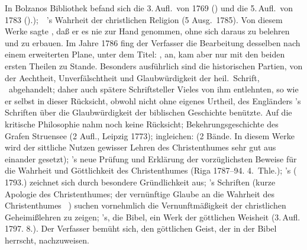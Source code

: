 \begin{aufza}
\begin{aufzb}
{	In Bolzanos Bibliothek befand sich die 3.\,Aufl.\ von 1769 () und die 5.\,Aufl.\ von 1783 ().});~\ 's Wahrheit der christlichen Religion (5 Ausg.\ 1785). Von diesem Werke sagte , daß er es nie zur Hand genommen, ohne sich daraus zu belehren und zu erbauen. Im Jahre 1786 fing der Verfasser die Bearbeitung desselben nach einem erweiterten Plane, unter dem Titel: , an, kam aber nur mit den beiden ersten Theilen zu Stande. Besonders ausführlich sind die historischen Partien, von der Aechtheit, Unverfälschtheit und Glaubwürdigkeit der heil.\ Schrift, \usw\ abgehandelt; daher auch spätere Schriftsteller Vieles von ihm entlehnten, so wie er selbst in dieser Rücksicht, obwohl nicht ohne eigenes Urtheil, des Engländers 's Schriften über die Glaubwürdigkeit der biblischen Geschichte benützte. Auf die kritische Philosophie nahm  noch keine Rücksicht;  Bekehrungsgeschichte des Grafen Struensee (2 Aufl., Leipzig 1773); ingleichen:  (2 Bände. In diesem Werke wird der sittliche Nutzen gewisser Lehren des Christenthumes sehr gut aus einander gesetzt); 's neue Prüfung und Erklärung der vorzüglichsten Beweise für die Wahrheit und Göttlichkeit des Christenthumes (Riga 1787--94. 4.~Thle.); 's  ( 1793.) zeichnet sich durch besondere Gründlichkeit aus; 's Schriften (kurze Apologie des Christenthumes; der vernünftige Glaube an die Wahrheit des Christenthumes \uam\ ) suchen vornehmlich die Vernunftmäßigkeit der christlichen Geheimißlehren zu zeigen; 's, die Bibel, ein Werk der göttlichen Weisheit (3.\,Aufl. 1797. 8.). 
Der Verfasser bemüht sich, den göttlichen Geist, der in der Bibel herrscht, nachzuweisen.

\end{aufzb}
\end{aufza}
